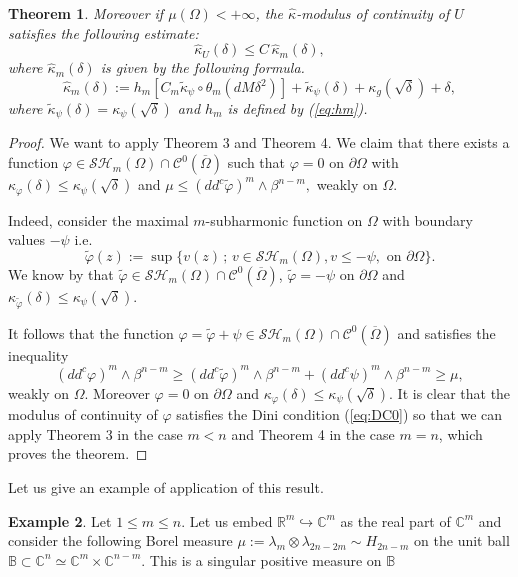 \documentclass[12pt]{amsart}
\newtheorem{theorem}{Theorem}
\theoremstyle{definition}
\newtheorem{example}[theorem]{Example}
\numberwithin{theorem}{section}
\numberwithin{equation}{section}
\newcommand{\B}{\mathbb{B}}
\newcommand{\R}{\mathbb{R}}
\newcommand{\C}{\mathbb{C}}
\begin{document}
{\begin{theorem}
 Moreover if $\mu (\Omega) < + \infty$,  the $\widehat{\kappa}$-modulus of continuity of $U$ satisfies the following estimate: 
$$
\widehat{\kappa}_U (\delta) \leq C  \, \widehat{\kappa}_m (\delta),
$$ 
 where  $\widehat{\kappa}_m (\delta)$ is given by the following formula.
 \begin{equation} \label {eq:generalsolution}
\widehat{\kappa}_m (\delta) :=   h_m \left[C_m \tilde{\kappa}_\psi  \circ\theta_m  \left(d M \delta^{2} \right)\right]  +  \tilde{\kappa}_\psi (\delta) + \kappa_g (\sqrt{\delta}) + \delta,
 \end{equation}
where $\tilde{\kappa}_\psi (\delta) =  \kappa_\psi (\sqrt{\delta})$ and $h_m$ is defined by (\ref{eq:hm}).
\end{theorem}
\begin{proof} We want to apply Theorem 3 and Theorem 4. 
We claim that there exists  a function $\varphi \in \mathcal{SH}_m(\Omega)\cap\mathcal{C}^{0}(\overline\Omega)$ such that  $\varphi = 0$ on $\partial \Omega$ with $\kappa_{\varphi} (\delta) \leq \kappa_\psi (\sqrt{\delta})$ and $\mu  \leq (dd^c \tilde \varphi)^m\wedge\beta^{n-m}, $ weakly on $\Omega$.

Indeed, consider the maximal $m$-subharmonic  function  on $\Omega$ with boundary values $ - \psi$  i.e.
$$
\tilde{\varphi} (z) := \sup \{v (z) \, ; \,  v \in \mathcal{SH}_m(\Omega), v \leq - \psi, \, \, \text{on} \, \, \partial \Omega \}.
$$ 
We know by \cite{Ch16b} that $\tilde{\varphi} \in \mathcal{SH}_m(\Omega)\cap\mathcal{C}^{0}(\overline\Omega)$, $\tilde{\varphi}= - \psi$ on $\partial \Omega$ and $\kappa_{\tilde{\varphi}} (\delta) \leq   \kappa_\psi (\sqrt{\delta})$.

It follows that the function $\varphi = \tilde \varphi + \psi \in \mathcal{SH}_m(\Omega)\cap\mathcal{C}^{0}(\overline\Omega)$ and  satisfies the inequality
 $$ (dd^c \varphi)^m\wedge\beta^{n-m} \geq  (dd^c \tilde{\varphi})^m\wedge\beta^{n-m} +  (dd^c\psi)^m\wedge\beta^{n-m} \geq \mu,
 $$
 weakly on $\Omega$. 
 Moreover $\varphi = 0$ on $\partial \Omega$ and $\kappa_{\varphi}  (\delta) \leq \kappa_\psi (\sqrt{\delta})$.
 It is clear that the modulus of continuity of $\varphi$ satisfies the Dini condition (\ref{eq:DC0}) so that we can apply Theorem 3 in the case $m < n$ and Theorem 4 in the case $m=n$,  which proves the theorem. 
\end{proof}

Let us give an example of application of this result.
\begin{example} Let $1 \leq m \leq n$. Let us embed $\R^m \hookrightarrow \C^m $ as the real part of $\C^m$ and consider the following Borel measure $\mu := \lambda_m \otimes \lambda_{2 n - 2 m} \sim H_{2n -m}$ on the unit ball $\B \subset  \C^n  \simeq  \C^m \times \C^{n - m}$. This is a singular positive measure on $\B$


\end{example}}
\end{document}
